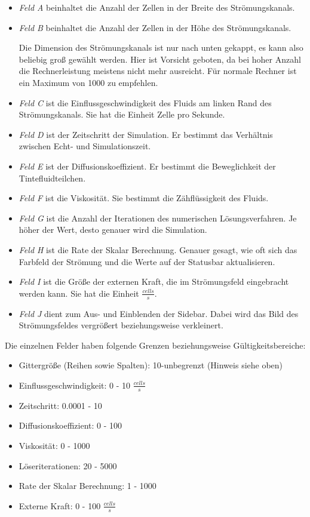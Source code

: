 \documentclass[a4paper,12pt]{scrreprt}
\begin{document}
\begin{itemize}

\item \textit{Feld A} beinhaltet die Anzahl der Zellen in der Breite des Str\"omungskanals.
\item \textit{Feld B} beinhaltet die Anzahl der Zellen in der H\"ohe des Str\"omungskanals.

Die Dimension des Str\"omungskanals ist nur nach unten gekappt, es kann also beliebig gro\ss{}  gew\"ahlt werden. Hier ist Vorsicht geboten, da bei hoher Anzahl die Rechnerleistung meistens nicht mehr ausreicht. F\"ur normale Rechner ist ein Maximum von 1000 zu empfehlen.
\item \textit{Feld C} ist die Einflussgeschwindigkeit des Fluids am linken Rand des Str\"omungskanals. Sie hat die Einheit Zelle pro Sekunde.
\item \textit{Feld D} ist der Zeitschritt der Simulation. Er bestimmt das Verh\"altnis zwischen Echt- und Simulationszeit.
\item \textit{Feld E} ist der Diffusionskoeffizient. Er bestimmt die Beweglichkeit der Tintefluidteilchen.
\item \textit{Feld F} ist die Viskosit\"at. Sie bestimmt die Z\"ahfl\"ussigkeit des Fluids.
\item \textit{Feld G} ist die Anzahl der Iterationen des numerischen L\"osungsverfahren. Je h\"oher der Wert, desto genauer wird die Simulation.
\item \textit{Feld H} ist die Rate der Skalar Berechnung. Genauer gesagt, wie oft sich das Farbfeld der Str\"omung und die Werte auf der Statusbar aktualisieren.
\item \textit{Feld I} ist die Gr\"o\ss e der externen Kraft, die im Str\"omungsfeld eingebracht werden kann. Sie hat die Einheit $\frac{cells}{s}$.
\item \textit{Feld J} dient zum Aus- und Einblenden der Sidebar. Dabei wird das Bild des Str\"omungsfeldes vergr\"o\ss ert beziehungsweise verkleinert.

\end{itemize}
Die einzelnen Felder haben folgende Grenzen beziehungsweise G\"ultigkeitsbereiche:
\begin{itemize}
\item Gittergr\"o\ss e (Reihen sowie Spalten): 10-unbegrenzt (Hinweis siehe oben)
\item Einflussgeschwindigkeit: 0 - 10 $\frac{cells}{s}$
\item Zeitschritt: 0.0001 - 10
\item Diffusionskoeffizient: 0 - 100
\item Viskosit\"at: 0 - 1000
\item L\"oseriterationen: 20 - 5000
\item Rate der Skalar Berechnung: 1 - 1000
\item Externe Kraft: 0 - 100 $\frac{cells}{s}$
\end{itemize}
\end{document}
